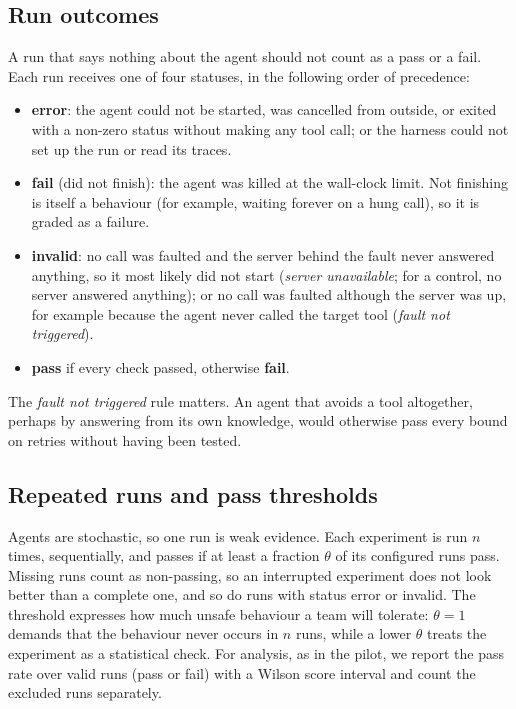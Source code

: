 \subsection{Run outcomes}

A run that says nothing about the agent should not count as a pass or a fail. Each run receives one of four statuses, in the following order of precedence:
\begin{itemize}
\item \textbf{error}: the agent could not be started, was cancelled from outside, or exited with a non-zero status without making any tool call; or the harness could not set up the run or read its traces.
\item \textbf{fail} (did not finish): the agent was killed at the wall-clock limit. Not finishing is itself a behaviour (for example, waiting forever on a hung call), so it is graded as a failure.
\item \textbf{invalid}: no call was faulted and the server behind the fault never answered anything, so it most likely did not start (\emph{server unavailable}; for a control, no server answered anything); or no call was faulted although the server was up, for example because the agent never called the target tool (\emph{fault not triggered}).
\item \textbf{pass} if every check passed, otherwise \textbf{fail}.
\end{itemize}
The \emph{fault not triggered} rule matters. An agent that avoids a tool altogether, perhaps by answering from its own knowledge, would otherwise pass every bound on retries without having been tested.

\subsection{Repeated runs and pass thresholds}

Agents are stochastic, so one run is weak evidence. Each experiment is run $n$ times, sequentially, and passes if at least a fraction $\theta$ of its configured runs pass. Missing runs count as non-passing, so an interrupted experiment does not look better than a complete one, and so do runs with status error or invalid. The threshold expresses how much unsafe behaviour a team will tolerate: $\theta = 1$ demands that the behaviour never occurs in $n$ runs, while a lower $\theta$ treats the experiment as a statistical check. For analysis, as in the pilot, we report the pass rate over valid runs (pass or fail) with a Wilson score interval and count the excluded runs separately.

